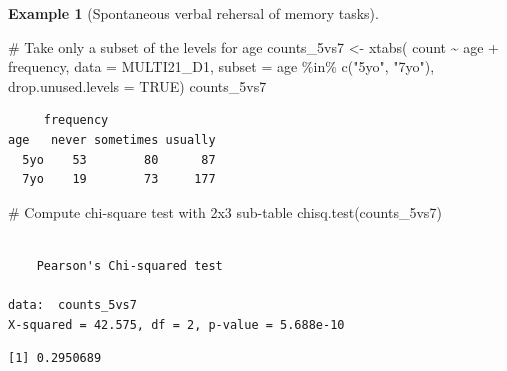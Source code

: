 \documentclass[
  11pt,
  letterpaper,
]{scrbook}
\newenvironment{Shaded}{\begin{snugshade}}{\end{snugshade}}
\newcommand{\AttributeTok}[1]{\textcolor[rgb]{0.40,0.45,0.13}{#1}}
\newcommand{\CommentTok}[1]{\textcolor[rgb]{0.37,0.37,0.37}{#1}}
\newcommand{\ConstantTok}[1]{\textcolor[rgb]{0.56,0.35,0.01}{#1}}
\newcommand{\FunctionTok}[1]{\textcolor[rgb]{0.28,0.35,0.67}{#1}}
\newcommand{\NormalTok}[1]{\textcolor[rgb]{0.00,0.23,0.31}{#1}}
\newcommand{\OtherTok}[1]{\textcolor[rgb]{0.00,0.23,0.31}{#1}}
\newcommand{\SpecialCharTok}[1]{\textcolor[rgb]{0.37,0.37,0.37}{#1}}
\newcommand{\StringTok}[1]{\textcolor[rgb]{0.13,0.47,0.30}{#1}}
\theoremstyle{definition}
\theoremstyle{definition}
\newtheorem{example}{Example}[chapter]
\theoremstyle{remark}
\begin{document}
\begin{example}[Spontaneous verbal rehersal of memory
tasks]
\begin{Shaded}
\begin{Highlighting}[]
\CommentTok{\# Take only a subset of the levels for age}
\NormalTok{counts\_5vs7 }\OtherTok{\textless{}{-}} \FunctionTok{xtabs}\NormalTok{(}
\NormalTok{  count }\SpecialCharTok{\textasciitilde{}}\NormalTok{ age }\SpecialCharTok{+}\NormalTok{ frequency, }
  \AttributeTok{data =}\NormalTok{ MULTI21\_D1,}
  \AttributeTok{subset =}\NormalTok{ age }\SpecialCharTok{\%in\%} \FunctionTok{c}\NormalTok{(}\StringTok{"5yo"}\NormalTok{, }\StringTok{"7yo"}\NormalTok{),}
  \AttributeTok{drop.unused.levels =} \ConstantTok{TRUE}\NormalTok{)}
\NormalTok{counts\_5vs7}
\end{Highlighting}
\end{Shaded}

\begin{verbatim}
     frequency
age   never sometimes usually
  5yo    53        80      87
  7yo    19        73     177
\end{verbatim}

\begin{Shaded}
\begin{Highlighting}[]
\CommentTok{\# Compute chi{-}square test with 2x3 sub{-}table}
\FunctionTok{chisq.test}\NormalTok{(counts\_5vs7)}
\end{Highlighting}
\end{Shaded}

\begin{verbatim}

    Pearson's Chi-squared test

data:  counts_5vs7
X-squared = 42.575, df = 2, p-value = 5.688e-10
\end{verbatim}

\begin{Shaded}
\end{Shaded}

\begin{verbatim}
[1] 0.2950689
\end{verbatim}

\end{example}
\end{document}
